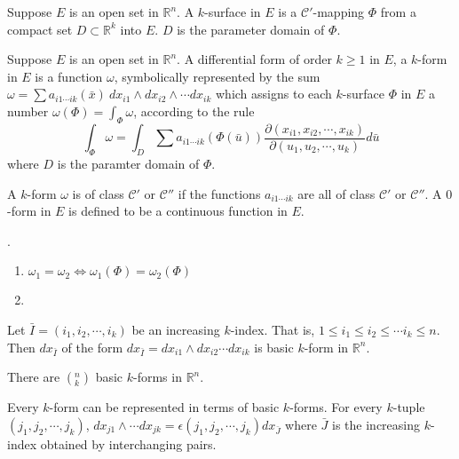 \begin{definition}
	Suppose $E$ is an open set in $\mathbb{R}^n$.
	A $k$-surface in $E$ is a $\mathscr{C}'$-mapping $\Phi$ from a compact set $D \subset \mathbb{R}^k$ into $E$.
	$D$ is the parameter domain of $\Phi$.
\end{definition}

\begin{definition}
	Suppose $E$ is an open set in $\mathbb{R}^n$.
	A differential form of order $k \ge 1$ in $E$, a $k$-form in $E$ is a function $\omega$, symbolically represented by the sum $\omega = \sum a_{i1\cdots ik}(\bar{x})\ dx_{i1}\wedge dx_{i2} \wedge \cdots dx_{ik}$ which assigns to each $k$-surface $\Phi$ in $E$ a number $\omega(\Phi) = \int_{\Phi} \omega $, according to the rule
	\begin{equation}
		\int_{\Phi} \omega = \int_D \sum a_{i1\cdots ik}(\Phi(\bar{u})) \frac{\partial(x_{i1},x_{i2},\cdots,x_{ik})}{\partial(u_1,u_2,\cdots,u_k)}d\bar{u}
	\end{equation}
	where $D$ is the paramter domain of $\Phi$.

	A $k$-form $\omega$ is of class $\mathscr{C}'$ or $\mathscr{C}''$ if the functions $a_{i1\cdots ik}$ are all of class $\mathscr{C}'$ or $\mathscr{C}''$.
	A $0$-form in $E$ is defined to be a continuous function in $E$.
\end{definition}

\begin{remark}.
	\begin{enumerate}
		\item $\omega_1 = \omega_2 \iff \omega_1(\Phi) = \omega_2(\Phi)$
		\item 
	\end{enumerate}
\end{remark}

\begin{definition}
	Let $\bar{I} = (i_1,i_2,\cdots,i_k)$ be an increasing $k$-index.
	That is, $1 \le i_1 \le i_2 \le \cdots i_k \le n$.
	Then $dx_{\bar{I}}$ of the form $dx_{\bar{I}} = dx_{i1} \wedge dx_{i2} \cdots dx_{ik}$ is basic $k$-form in $\mathbb{R}^n$.

	There are $(^n_k)$ basic $k$-forms in $\mathbb{R}^n$.

	Every $k$-form can be represented in terms of basic $k$-forms.
	For every $k$-tuple $(j_1,j_2,\cdots,j_k)$, $dx_{j1} \wedge \cdots dx_{jk} = \epsilon(j_1,j_2,\cdots,j_k)dx_{\bar{J}}$ where $\bar{J}$ is the increasing $k$-index obtained by interchanging pairs.
\end{definition}



